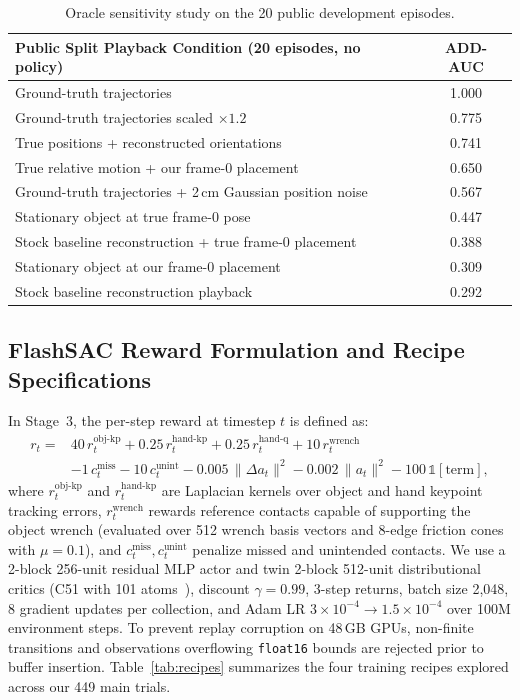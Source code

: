 \documentclass[10pt]{nvidiaextabstract}
\begin{document}
\begin{table}[t]
  \centering\small
  \begin{tabular}{@{}lc@{}}
    \toprule
    \textbf{Public Split Playback Condition (20 episodes, no policy)} & \textbf{ADD-AUC} \\
    \midrule
    Ground-truth trajectories & 1.000 \\
    Ground-truth trajectories scaled $\times 1.2$ & 0.775 \\
    True positions + reconstructed orientations & 0.741 \\
    True relative motion + our frame-0 placement & 0.650 \\
    Ground-truth trajectories + 2\,cm Gaussian position noise & 0.567 \\
    Stationary object at true frame-0 pose & 0.447 \\
    Stock baseline reconstruction + true frame-0 placement & 0.388 \\
    Stationary object at our frame-0 placement & 0.309 \\
    Stock baseline reconstruction playback & 0.292 \\
    \bottomrule
  \end{tabular}
  \caption{Oracle sensitivity study on the 20 public development episodes.}
  \label{tab:oracle}
\end{table}

\subsection{FlashSAC Reward Formulation and Recipe Specifications}
\label{app:policy}
In Stage~3, the per-step reward at timestep $t$ is defined as:
\begin{equation}
\label{eq:reward}
\begin{aligned}
r_t ={}& 40\,r^\text{obj-kp}_t + 0.25\,r^\text{hand-kp}_t + 0.25\,r^\text{hand-q}_t + 10\,r^\text{wrench}_t \\
     & - 1\,c^\text{miss}_t - 10\,c^\text{unint}_t - 0.005\,\|\Delta a_t\|^2 - 0.002\,\|a_t\|^2 - 100\,\mathbb{1}[\text{term}],
\end{aligned}
\end{equation}
where $r^\text{obj-kp}_t$ and $r^\text{hand-kp}_t$ are Laplacian kernels over object and hand keypoint tracking errors, $r^\text{wrench}_t$ rewards reference contacts capable of supporting the object wrench (evaluated over 512 wrench basis vectors and 8-edge friction cones with $\mu=0.1$), and $c^\text{miss}_t, c^\text{unint}_t$ penalize missed and unintended contacts. We use a 2-block 256-unit residual MLP actor and twin 2-block 512-unit distributional critics (C51 with 101 atoms~\cite{bellemare2017c51}), discount $\gamma=0.99$, 3-step returns, batch size 2,048, 8 gradient updates per collection, and Adam LR $3\times 10^{-4} \rightarrow 1.5\times 10^{-4}$ over 100M environment steps. To prevent replay corruption on 48\,GB GPUs, non-finite transitions and observations overflowing \texttt{float16} bounds are rejected prior to buffer insertion. Table~\ref{tab:recipes} summarizes the four training recipes explored across our 449 main trials.
\end{document}
